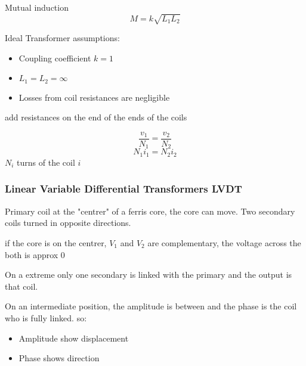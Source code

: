 \documentclass[]{article}
\begin{document}
Mutual induction 
$$M=k\sqrt{L_1L_2}$$

Ideal Transformer assumptions:
\begin{itemize}
	\item Coupling coefficient $k=1$
	\item $L_1=L_2=\infty$
	\item Losses from coil resistances are negligible
\end{itemize}

add resistances on the end of the ends of the coils

$$\frac{v_1}{N_1}=\frac{v_2}{N_2}$$
$$N_1i_1=N_2i_2 $$
$N_i$ turns of the coil $i$

\subsubsection{Linear Variable Differential Transformers LVDT}
Primary coil at the "centrer" of a ferris core, the core can move.
Two secondary coils turned in opposite directions.  

if the core is on the centrer, $V_1$ and $V_2$ are complementary, the voltage across the both is approx 0

On a extreme only one secondary is linked with the primary and the output is that coil.

On an intermediate position, the amplitude is between and the phase is the coil who is fully linked. so:
\begin{itemize}
	\item Amplitude show displacement
	\item Phase shows direction
\end{itemize} 
\end{document}
